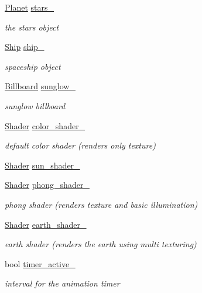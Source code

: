 \begin{DoxyCompactItemize}
\hyperlink{classPlanet}{Planet} \hyperlink{classSolar__viewer_aeaeb8ed645d3e4a14ac8cda157472f39}{stars\+\_\+}
\begin{DoxyCompactList}\small\item\em the stars object \end{DoxyCompactList}\item 
\hyperlink{classShip}{Ship} \hyperlink{classSolar__viewer_a15b5951427b3a4abad4715255c94f2bd}{ship\+\_\+}
\begin{DoxyCompactList}\small\item\em spaceship object \end{DoxyCompactList}\item 
\hyperlink{classBillboard}{Billboard} \hyperlink{classSolar__viewer_a6a7e25827438c0e43f17e53d28041a79}{sunglow\+\_\+}
\begin{DoxyCompactList}\small\item\em sunglow billboard \end{DoxyCompactList}\item 
\hyperlink{classShader}{Shader} \hyperlink{classSolar__viewer_aed950d77f461e1ce32ba1dcf3898b814}{color\+\_\+shader\+\_\+}
\begin{DoxyCompactList}\small\item\em default color shader (renders only texture) \end{DoxyCompactList}\item 
\hyperlink{classShader}{Shader} \hyperlink{classSolar__viewer_a2b1a9a122bcbeebae265b49a1d048154}{sun\+\_\+shader\+\_\+}
\item 
\hyperlink{classShader}{Shader} \hyperlink{classSolar__viewer_a3f0eaae53b84778ce774d1c2ced29b9f}{phong\+\_\+shader\+\_\+}
\begin{DoxyCompactList}\small\item\em phong shader (renders texture and basic illumination) \end{DoxyCompactList}\item 
\hyperlink{classShader}{Shader} \hyperlink{classSolar__viewer_a5a423c2328fd2d79de95a2a270b385e3}{earth\+\_\+shader\+\_\+}
\begin{DoxyCompactList}\small\item\em earth shader (renders the earth using multi texturing) \end{DoxyCompactList}\item 
bool \hyperlink{classSolar__viewer_aedc75568a6aafd2ecf8245ed518f6214}{timer\+\_\+active\+\_\+}
\begin{DoxyCompactList}\small\item\em interval for the animation timer \end{DoxyCompactList}\item 

\end{DoxyCompactItemize}
